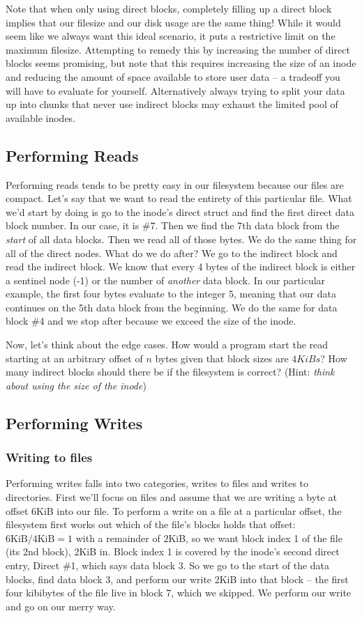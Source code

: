 Note that when only using direct blocks, completely filling up a direct block implies that our filesize and our disk usage are the same thing!
While it would seem like we always want this ideal scenario, it puts a restrictive limit on the maximum filesize.
Attempting to remedy this by increasing the number of direct blocks seems promising, but note that this requires increasing the size of an inode and reducing the amount of space available to store user data -- a tradeoff you will have to evaluate for yourself.
Alternatively always trying to split your data up into chunks that never use indirect blocks may exhaust the limited pool of available inodes.


\subsection{Performing Reads}

Performing reads tends to be pretty easy in our filesystem because our files are compact.
Let's say that we want to read the entirety of this particular file.
What we'd start by doing is go to the inode's direct struct and find the first direct data block number.
In our case, it is \#7.
Then we find the 7th data block from the \textit{start} of all data blocks.
Then we read all of those bytes.
We do the same thing for all of the direct nodes.
What do we do after? 
We go to the indirect block and read the indirect block.
We know that every 4 bytes of the indirect block is either a sentinel node (-1) or the number of \textit{another} data block.
In our particular example, the first four bytes evaluate to the integer 5, meaning that our data continues on the 5th data block from the beginning.
We do the same for data block \#4 and we stop after because we exceed the size of the inode.

Now, let's think about the edge cases.
How would a program start the read starting at an arbitrary offset of $n$ bytes given that block sizes are $4 KiBs$?
How many indirect blocks should there be if the filesystem is correct? (Hint: \textit{think about using the size of the inode})

\subsection{Performing Writes}
\subsubsection{Writing to files}
Performing writes falls into two categories, writes to files and writes to directories.
First we'll focus on files and assume that we are writing a byte at offset 6KiB into our file.
To perform a write on a file at a particular offset, the filesystem first works out which of the file's blocks holds that offset: $6\text{KiB} / 4\text{KiB} = 1$ with a remainder of $2$KiB, so we want block index 1 of the file (its 2nd block), 2KiB in.
Block index 1 is covered by the inode's second direct entry, Direct \#1, which says data block $3$.
So we go to the start of the data blocks, find data block $3$, and perform our write 2KiB into that block -- the first four kibibytes of the file live in block 7, which we skipped.
We perform our write and go on our merry way.

